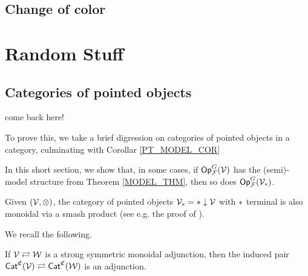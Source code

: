 \documentclass[a4paper,10pt
,draft
]{article}%
\renewcommand{\F}{\mathcal F}
\renewcommand{\1}{\eta}%
\begin{document}
\subsection{Change of color}




\section{Random Stuff}

\subsection{Categories of pointed objects}
\label{PT_SEC}
come back here!

To prove this, we take a brief digression on categories of pointed objects in a category,
culminating with Corollar \ref{PT_MODEL_COR}

In this short section, we show that, in some cases,
if $\Op^G_\F(\V)$ has the (semi)-model structure from Theorem \ref{MODEL_THM}, then so does $\Op^G_\F(\V_{\**})$.


Given $(\mathcal V, \otimes)$, the category of pointed objects $\V_{\**} = \** \downarrow \V$ with $\**$ terminal
is also monoidal via a smash product (see e.g. the proof of \cite[Prop. 4.2.9]{Hov99}).


We recall the following.

\begin{lemma}
      If $\mathcal V \rightleftarrows \mathcal W$ is a strong symmetric monoidal adjunction, then
      the induced pair $\mathsf{Cat}^{\mathfrak C}(\mathcal V) \rightleftarrows \mathsf{Cat}^{\mathfrak C}(\mathcal W)$ is an adjunction.
\end{lemma}
\end{document}
